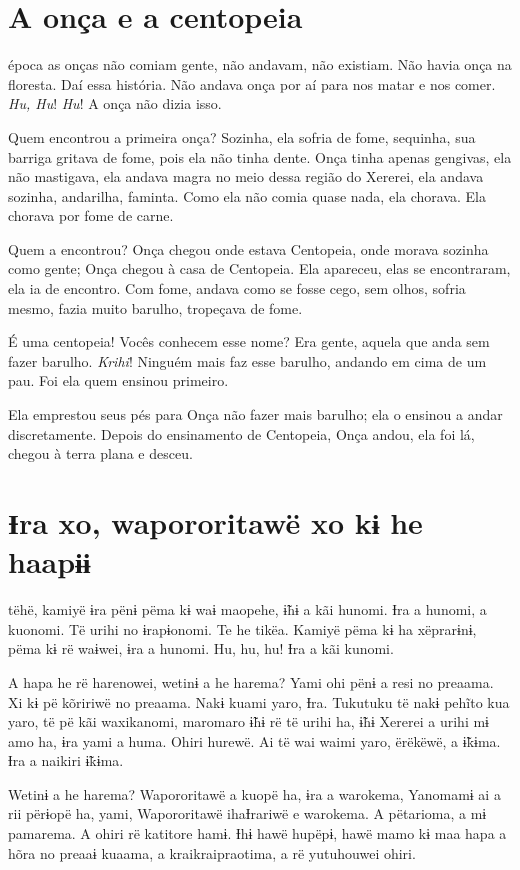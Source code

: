  
\chapter{A onça e a centopeia}
 
 época as onças não comiam gente, não andavam, não existiam. Não
havia onça na floresta. Daí essa história. Não andava onça por aí para nos
matar e nos comer. \textit{Hu, Hu}! \textit{Hu}! A onça não dizia isso. 

Quem encontrou a primeira onça? Sozinha, ela sofria de fome, sequinha,
sua barriga gritava de fome, pois ela não tinha dente. Onça tinha apenas
gengivas, ela não mastigava, ela andava magra no meio dessa região do
Xererei, ela andava sozinha, andarilha, faminta. Como ela não comia quase
nada, ela chorava. Ela chorava por fome de carne. 

Quem a encontrou? Onça chegou onde estava Centopeia, onde morava
sozinha como gente; Onça chegou à casa de Centopeia. Ela apareceu, elas
se encontraram, ela ia de encontro. Com fome, andava como se fosse cego,
sem olhos, sofria mesmo, fazia muito barulho, tropeçava de fome. 

É uma centopeia! Vocês conhecem esse nome? Era gente, aquela que anda
sem fazer barulho. \textit{Krihi}! Ninguém mais faz esse barulho, andando em cima de um pau.
Foi ela quem ensinou primeiro. 

Ela emprestou seus pés para Onça não fazer mais barulho; ela o ensinou a
andar discretamente. Depois do ensinamento de Centopeia, Onça andou, ela
foi lá, chegou à terra plana e desceu.

\chapter{Ɨra xo, wapororitawë xo kɨ he haapɨɨ}

 
 tëhë, kamiyë ɨra pënɨ pëma kɨ waɨ maopehe, ɨ̃hɨ a kãi hunomi. Ɨra a
hunomi, a kuonomi. Të urihi no ɨrapɨonomi. Te he tikëa. Kamiyë pëma kɨ
ha xëprarɨnɨ, pëma kɨ rë waɨwei, ɨra a hunomi. Hu, hu, hu! Ɨra a kãi
kunomi. 

A hapa he rë harenowei, wetinɨ a he harema? Yami ohi pënɨ a resi no
preaama. Xi kɨ pë kõririwë no preaama. Nakɨ kuami yaro, Ɨra. Tukutuku të
nakɨ pehĩto kua yaro, të pë kãi waxikanomi, maromaro ɨ̃hɨ rë të urihi ha,
ɨ̃hɨ Xererei a urihi mɨ amo ha, ɨra yami a huma. Ohiri hurewë. Ai të wai
waimi yaro, ërëkëwë, a ɨ̃kɨma. Ɨra a naikiri ɨ̃kɨma. 

Wetinɨ a he harema? Wapororitawë a kuopë ha, ɨra a warokema, Yanomamɨ ai
a rii përɨopë ha, yami, Wapororitawë ihaƗrariwë e warokema. A pëtarioma,
a mɨ pamarema. A ohiri rë katitore hamɨ. Ɨhɨ hawë hupëpɨ, hawë mamo kɨ
maa hapa a hõra no preaaɨ kuaama, a kraikraipraotima, a rë yutuhouwei
ohiri. 

